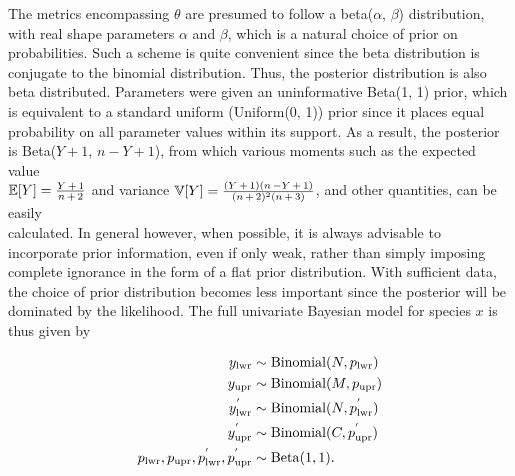\documentclass[12pt]{article}
\begin{document}
The metrics encompassing $\theta$ are presumed to follow a beta($\alpha$, $\beta$) distribution, with real shape parameters $\alpha$ and $\beta$, which is a natural choice of prior on probabilities. Such a scheme is quite convenient since the beta distribution is conjugate to the binomial distribution. Thus, the posterior distribution is also beta distributed. Parameters were given an uninformative Beta(1, 1) prior, which is equivalent to a standard uniform (Uniform(0, 1)) prior since it places equal probability on all parameter values within its support. As a result, the posterior is Beta($Y + 1$, $n - Y + 1$), from which various moments such as the expected value \\ $\mathbb{E}[Y] = \frac{Y \hspace{0.5mm} + \hspace{0.5mm} 1}{n \hspace{0.5mm} + \hspace{0.5mm} 2}$ and variance $\mathbb{V}[Y] = \frac{(Y \hspace{0.5mm} + \hspace{0.5mm} 1)(n \hspace{0.5mm} - Y \hspace{0.5mm} + \hspace{0.5mm} 1)}{(n \hspace{0.5mm} + \hspace{0.5mm} 2)^2(n \hspace{0.5mm} + \hspace{0.5mm} 3)}$, and other quantities, can be easily \\ calculated. In general however, when possible, it is always advisable to incorporate prior information, even if only weak, rather than simply imposing complete ignorance in the form of a flat prior distribution. With sufficient data, the choice of prior distribution becomes less important since the posterior will be dominated by the likelihood.  The full univariate Bayesian model for species $x$ is thus given by

\begin{align}
\notag y_\mathrm{lwr} &\sim \mathrm{Binomial}(N, p_\mathrm{lwr}) \\ 
\notag y_\mathrm{upr} &\sim \mathrm{Binomial}(M, p_\mathrm{upr}) \\ 
y^{'}_\mathrm{lwr} &\sim \mathrm{Binomial}(N, p^{'}_\mathrm{lwr}) \\ 
 \notag y^{'}_\mathrm{upr} &\sim \mathrm{Binomial}(C, p^{'}_\mathrm{upr}) \\ 
\notag p_\mathrm{lwr}, p_\mathrm{upr}, p^{'}_\mathrm{lwr}, p^{'}_\mathrm{upr}
&\sim \mathrm{Beta}(1, 1).
\end{align}
\end{document}
